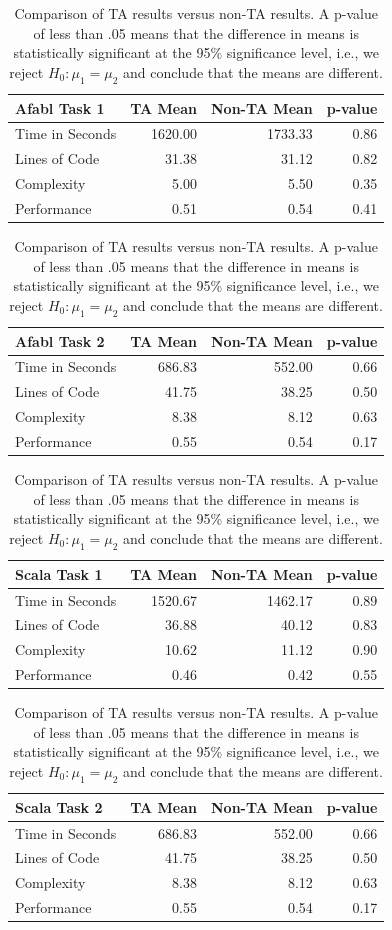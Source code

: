 \begin{center}
\begin{table}[h]
\begin{center}
\begin{tabular}{|l|r|r|r|}\hline
Afabl Task 1 & TA Mean & Non-TA Mean & p-value \\\hline
Time in Seconds & 1620.00 & 1733.33 & 0.86\\
Lines of Code & 31.38 & 31.12 & 0.82\\
Complexity & 5.00 & 5.50 & 0.35\\
Performance & 0.51 & 0.54 & 0.41\\
\hline
\end{tabular}


\begin{tabular}{|l|r|r|r|}\hline
Afabl Task 2 & TA Mean & Non-TA Mean & p-value \\\hline
Time in Seconds & 686.83 & 552.00 & 0.66\\
Lines of Code & 41.75 & 38.25 & 0.50\\
Complexity & 8.38 & 8.12 & 0.63\\
Performance & 0.55 & 0.54 & 0.17\\
\hline
\end{tabular}


\begin{tabular}{|l|r|r|r|}\hline
Scala Task 1 & TA Mean & Non-TA Mean & p-value \\\hline
Time in Seconds & 1520.67 & 1462.17 & 0.89\\
Lines of Code & 36.88 & 40.12 & 0.83\\
Complexity & 10.62 & 11.12 & 0.90\\
Performance & 0.46 & 0.42 & 0.55\\
\hline
\end{tabular}


\begin{tabular}{|l|r|r|r|}\hline
Scala Task 2 & TA Mean & Non-TA Mean & p-value \\\hline
Time in Seconds & 686.83 & 552.00 & 0.66\\
Lines of Code & 41.75 & 38.25 & 0.50\\
Complexity & 8.38 & 8.12 & 0.63\\
Performance & 0.55 & 0.54 & 0.17\\
\hline
\end{tabular}
\end{center}
\caption{Comparison of TA results versus non-TA results. A p-value of less than .05 means that the difference in means is statistically significant at the 95\% significance level, i.e., we reject $H_0: \mu_1 = \mu_2$ and conclude that the means are different.}
\label{tbl:tas-vs-non-tas}
\end{table}
\end{center}


